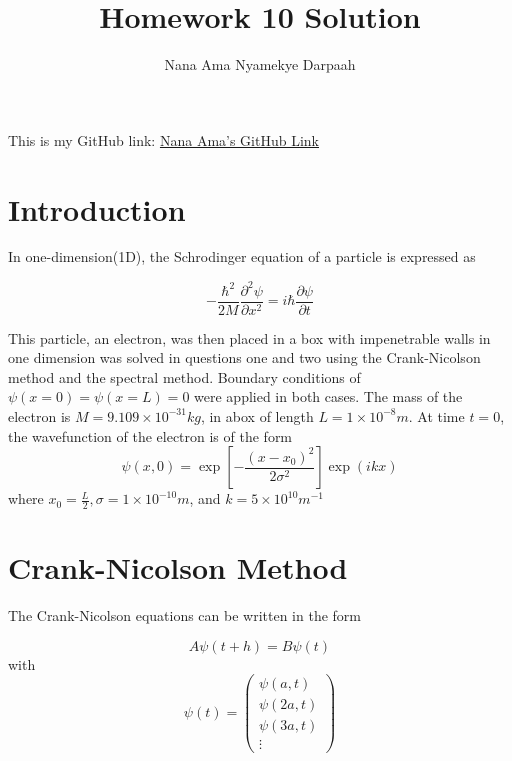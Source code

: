 \documentclass[11pt]{article}
\title{Homework 10 Solution}
\author{Nana Ama Nyamekye Darpaah}
\begin{document}
	
	\maketitle
	This is my GitHub link: \href{https://github.com/nnd2016/phys-ga2000.git}{Nana Ama's GitHub Link}
	
	
	\section{Introduction}
	In one-dimension(1D), the Schrodinger equation of a particle is expressed as
	
	\begin{equation}
	 -\frac{\hbar^{2}}{2M}\frac{\partial^{2}\psi}{\partial{x}^{2}} = i\hbar\frac{\partial\psi}{\partial t}
	 \label{eq1}
	\end{equation}

	This particle, an electron, was then placed in a box with impenetrable walls in one dimension was solved in questions one and two using the Crank-Nicolson method and the spectral method. Boundary conditions of $\psi(x=0) = \psi(x=L) = 0$ were applied in both cases. The mass of the electron is $M = 9.109 \times 10^{-31} kg$, in abox of length $L = 1 \times 10^{-8} m$. At time $t = 0$, the wavefunction of the electron is of the form 
	\begin{equation}
		\psi(x, 0) = \exp[-\frac{(x-x_{0})^{2}}{2 \sigma^{2}}] \exp(ikx)
		\label{eq2}
	\end{equation}
	where $x_{0} = \frac{L}{2}, \sigma = 1 \times 10^{-10} m$, and $k = 5 \times 10^{10} m^{-1}$
	
	
	\section{Crank-Nicolson Method}
	The Crank-Nicolson equations can be written in the form 
	
	\begin{equation}
		A \psi(t + h) = B \psi(t)
		\label{eq3}
	\end{equation}
with
	\begin{equation}
		\psi(t) = \begin{pmatrix}
			\psi(a, t)\\\psi(2a, t)\\\psi(3a, t)\\ \vdots
		\end{pmatrix}	
	\label{eq4}
	\end{equation}
\end{document}
